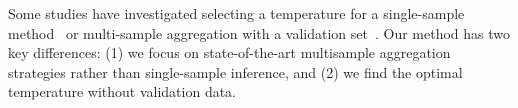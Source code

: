 Some studies have investigated selecting a temperature for a single-sample method~\cite{zhang2024edt, li2024dynamic, kumar2019calibration, xie2024calibrating, dhuliawala2024adaptive} or multi-sample aggregation with a validation set~\cite{zhang2024scaling}. Our method has two key differences: (1) we focus on state-of-the-art multisample aggregation strategies rather than single-sample inference, and (2) we find the optimal temperature without validation data.

